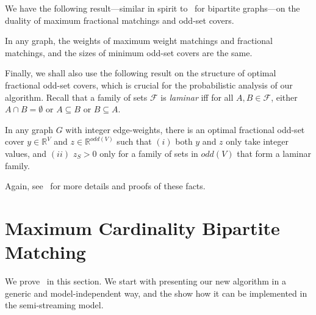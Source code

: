 \documentclass{article}
\newcommand{\IR}{\mathbb{R}}
\begin{document}
We have the following result---similar in spirit to~ for bipartite graphs---on the duality of maximum fractional matchings and odd-set covers. 

\begin{fact}\label{fact:edmonds}
In any graph, the weights of maximum weight matchings and fractional matchings, and the sizes of minimum odd-set covers are the same. 
\end{fact}

Finally, we shall also use the following result on the structure of optimal fractional odd-set covers, which is crucial for the probabilistic analysis of our algorithm. 
Recall that a family of sets $\mathcal{F}$ is \emph{laminar} iff for all $A,B \in \mathcal{F}$, either $A \cap B = \emptyset$ or $A \subseteq B$ or $B \subseteq A$.

\begin{fact}\label{fact:cunningham-marsh}
	In any graph $G$ with integer edge-weights, there is an optimal fractional odd-set cover $y \in \IR^V$ and $z \in \IR^{odd(V)}$ such that $(i)$ both $y$ and $z$ only take integer values, 
	and $(ii)$  $z_S > 0$ only for a family of sets in $odd(V)$ that form a laminar family. 
\end{fact}

Again, see~\cite{LovaszP09} for more details and proofs of these facts. 

\section{Maximum Cardinality Bipartite Matching}\label{sec:bipartite}

We prove~ in this section.  We start with presenting our new algorithm in a generic and model-independent way, and the show how it can be implemented in the semi-streaming model. 
\end{document}
